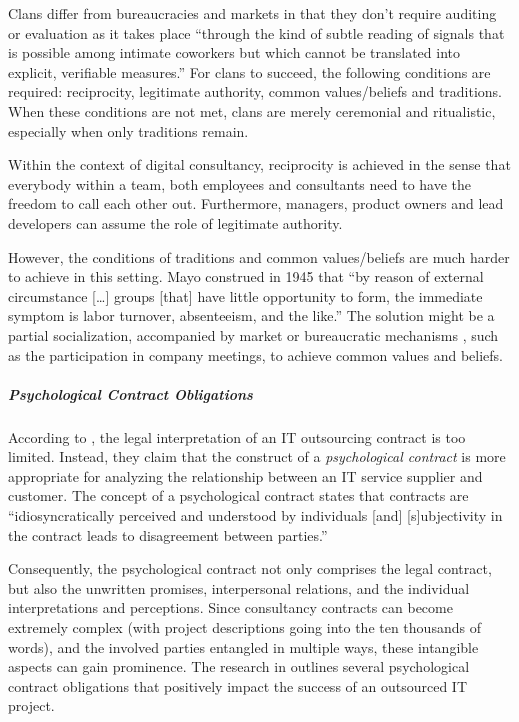\documentclass[12pt]{article}
\begin{document}
Clans differ from bureaucracies and markets in that they don't require
auditing or evaluation as it takes place ``through the kind of subtle
reading of signals that is possible among intimate coworkers but which
cannot be translated into explicit, verifiable measures.'' \citep[
137]{ouchi1980} For clans to succeed, the following conditions are
required: reciprocity, legitimate authority, common values/beliefs and
traditions. When these conditions are not met, clans are merely
ceremonial and ritualistic, especially when only traditions remain.

Within the context of digital consultancy, reciprocity is achieved in
the sense that everybody within a team, both employees and consultants
need to have the freedom to call each other out. Furthermore, managers,
product owners and lead developers can assume the role of legitimate
authority.

However, the conditions of traditions and common values/beliefs are much
harder to achieve in this setting. Mayo construed in 1945 that ``by
reason of external circumstance {[}\ldots{]} groups {[}that{]} have
little opportunity to form, the immediate symptom is labor turnover,
absenteeism, and the like.'' \citep[ 111]{mayo1945} The solution might
be a partial socialization, accompanied by market or bureaucratic
mechanisms \citep[ 138]{ouchi1980}, such as the participation in company
meetings, to achieve common values and beliefs.

\subparagraph{Psychological Contract
Obligations}\label{psychological-contract-obligations}

According to \citet[357]{ang2004}, the legal interpretation of an IT
outsourcing contract is too limited. Instead, they claim that the
construct of a \emph{psychological contract} is more appropriate for
analyzing the relationship between an IT service supplier and customer.
The concept of a psychological contract states that contracts are
``idiosyncratically perceived and understood by individuals {[}and{]}
{[}s{]}ubjectivity in the contract leads to disagreement between
parties.'' \citep[ 21]{rousseau1993}

Consequently, the psychological contract not only comprises the legal
contract, but also the unwritten promises, interpersonal relations, and
the individual interpretations and perceptions. Since consultancy
contracts can become extremely complex (with project descriptions going
into the ten thousands of words), and the involved parties entangled in
multiple ways, these intangible aspects can gain prominence. The
research in \citet[369-70]{ang2004} outlines several psychological
contract obligations that positively impact the success of an outsourced
IT project.
\end{document}
